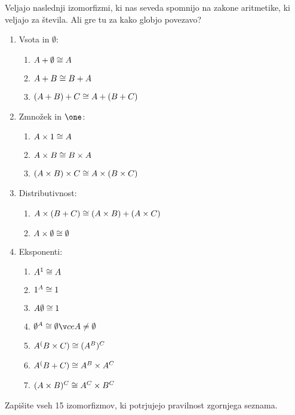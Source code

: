 Veljajo naslednji izomorfizmi, ki nas seveda spomnijo na zakone aritmetike, ki
veljajo za števila. Ali gre tu za kako globjo povezavo?
%
\begin{enumerate}
\item Vsota in $\emptyset$:
  \begin{enumerate}
    \item $A + \emptyset \cong A$
    \item $A + B \cong B + A$
    \item $(A + B) + C \cong A + (B + C)$
  \end{enumerate}

\item Zmnožek in $\one$:
  \begin{enumerate}
    \item $A \times 1 \cong A$
    \item $A \times B \cong B \times A$
    \item $(A \times B) \times C \cong A \times (B \times C)$
  \end{enumerate}

\item Distributivnost:
  \begin{enumerate}
    \item $A \times (B + C) \cong (A \times B) + (A \times C)$
    \item $A \times \emptyset \cong \emptyset$
  \end{enumerate}

\item Eksponenti:
  \begin{enumerate}
    \item $A^1 \cong A$
    \item $1^A \cong 1$
    \item $A \emptyset \cong 1$
    \item $\emptyset^A \iso \emptyset če A \neq \emptyset$
    \item $A^(B \times C) \cong (A^B)^C$
    \item $A^(B + C) \cong A^B \times A^C$
    \item $(A \times B)^C \cong A^C \times B^C$
  \end{enumerate}
\end{enumerate}

\begin{naloga}
  Zapišite vseh 15 izomorfizmov, ki potrjujejo pravilnost zgornjega seznama.
\end{naloga}
